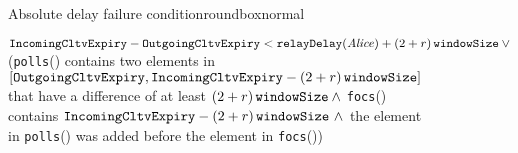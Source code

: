   \begin{figure}[H]
    \begin{titlebox}{\normalfont Absolute delay failure
    condition}{roundbox}{normal}
      \begin{algorithmic}[1,nonumber]
        \State $\mathtt{IncomingCltvExpiry} - \mathtt{OutgoingCltvExpiry} <
        \mathtt{relayDelay}(\mathit{Alice}) + \left(2 + r\right)\texttt{windowSize}{} \: \vee$
        \State (\texttt{polls}(\dave) contains two elements in
        $[\mathtt{OutgoingCltvExpiry}, \mathtt{IncomingCltvExpiry} -
        \left(2 + r\right)\texttt{windowSize}{}]$ that have a difference of at least $\left(2 + r\right)\texttt{windowSize}{} \: \wedge$
        \State \texttt{focs}(\dave) contains $\mathtt{IncomingCltvExpiry} -
        \left(2 + r\right)\texttt{windowSize}{} \ \wedge$
        \State the element in \texttt{polls}(\dave) was added before the element
        in \texttt{focs}(\dave))
      \end{algorithmic}
    \end{titlebox}
    \caption{}
    \label{alg:fpaynet:resolvepay:haltcond:abs}
  \end{figure}

